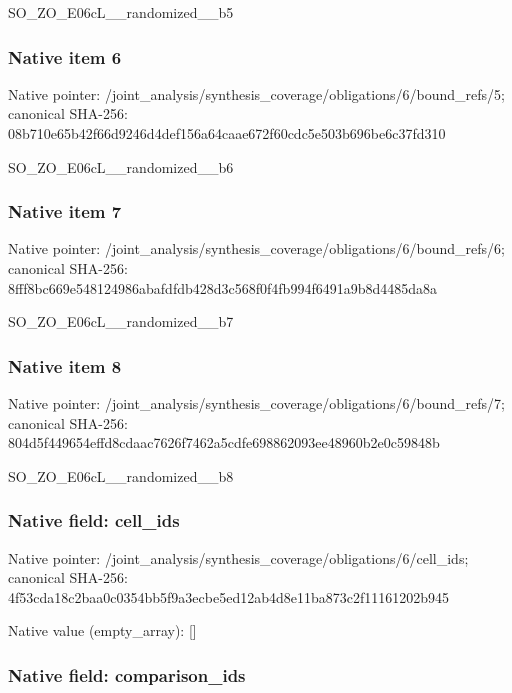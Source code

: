 \documentclass[10pt,a4paper]{article}
\begin{document}
SO\_ZO\_E06cL\_\_randomized\_\_b5


\subsubsection{Native item 6}


Native pointer: /joint\_analysis/synthesi\allowbreak{}s\_coverage/obligations/6\allowbreak{}/bound\_refs/5; canonical SHA-256: 08b710e65b42f66d9246d4de\allowbreak{}f156a64caae672f60cdc5e50\allowbreak{}3b696be6c37fd310


SO\_ZO\_E06cL\_\_randomized\_\_b6


\subsubsection{Native item 7}


Native pointer: /joint\_analysis/synthesi\allowbreak{}s\_coverage/obligations/6\allowbreak{}/bound\_refs/6; canonical SHA-256: 8fff8bc669e548124986abaf\allowbreak{}dfdb428d3c568f0f4fb994f6\allowbreak{}491a9b8d4485da8a


SO\_ZO\_E06cL\_\_randomized\_\_b7


\subsubsection{Native item 8}


Native pointer: /joint\_analysis/synthesi\allowbreak{}s\_coverage/obligations/6\allowbreak{}/bound\_refs/7; canonical SHA-256: 804d5f449654effd8cdaac76\allowbreak{}26f7462a5cdfe698862093ee\allowbreak{}48960b2e0c59848b


SO\_ZO\_E06cL\_\_randomized\_\_b8


\subsubsection{Native field: cell\_ids}


Native pointer: /joint\_analysis/synthesi\allowbreak{}s\_coverage/obligations/6\allowbreak{}/cell\_ids; canonical SHA-256: 4f53cda18c2baa0c0354bb5f\allowbreak{}9a3ecbe5ed12ab4d8e11ba87\allowbreak{}3c2f11161202b945



Native value (empty\_array): []



\subsubsection{Native field: comparison\_ids}
\end{document}
